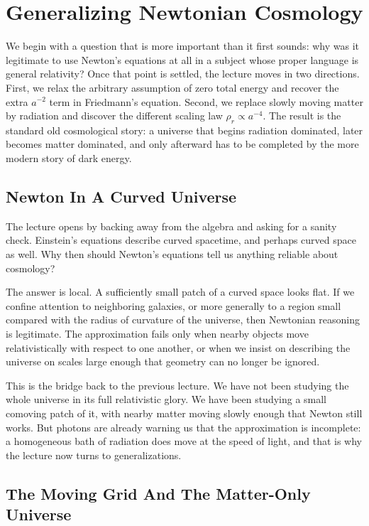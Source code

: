 \chapter{Generalizing Newtonian Cosmology}

We begin with a question that is more important than it first sounds: why was it legitimate to use Newton's equations at all in a subject whose proper language is general relativity? Once that point is settled, the lecture moves in two directions. First, we relax the arbitrary assumption of zero total energy and recover the extra \(a^{-2}\) term in Friedmann's equation. Second, we replace slowly moving matter by radiation and discover the different scaling law \(\rho_r \propto a^{-4}\). The result is the standard old cosmological story: a universe that begins radiation dominated, later becomes matter dominated, and only afterward has to be completed by the more modern story of dark energy.

\section{Newton In A Curved Universe}

The lecture opens by backing away from the algebra and asking for a sanity check. Einstein's equations describe curved spacetime, and perhaps curved space as well. Why then should Newton's equations tell us anything reliable about cosmology?

The answer is local. A sufficiently small patch of a curved space looks flat. If we confine attention to neighboring galaxies, or more generally to a region small compared with the radius of curvature of the universe, then Newtonian reasoning is legitimate. The approximation fails only when nearby objects move relativistically with respect to one another, or when we insist on describing the universe on scales large enough that geometry can no longer be ignored.

This is the bridge back to the previous lecture. We have not been studying the whole universe in its full relativistic glory. We have been studying a small comoving patch of it, with nearby matter moving slowly enough that Newton still works. But photons are already warning us that the approximation is incomplete: a homogeneous bath of radiation does move at the speed of light, and that is why the lecture now turns to generalizations.

\section{The Moving Grid And The Matter-Only Universe}

